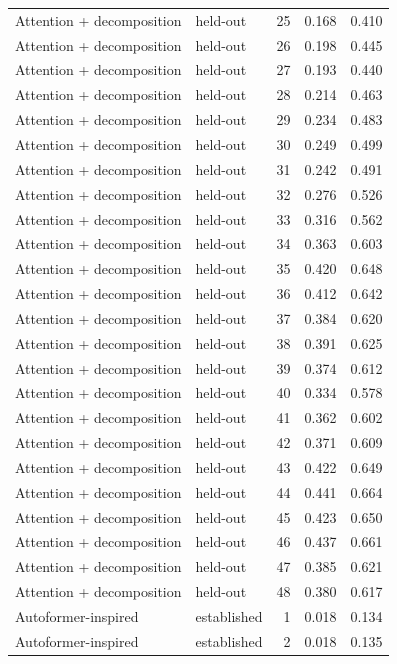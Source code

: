 \begin{tabular}{llrrr}
Attention + decomposition & held-out & 25 & 0.168 & 0.410 \\
Attention + decomposition & held-out & 26 & 0.198 & 0.445 \\
Attention + decomposition & held-out & 27 & 0.193 & 0.440 \\
Attention + decomposition & held-out & 28 & 0.214 & 0.463 \\
Attention + decomposition & held-out & 29 & 0.234 & 0.483 \\
Attention + decomposition & held-out & 30 & 0.249 & 0.499 \\
Attention + decomposition & held-out & 31 & 0.242 & 0.491 \\
Attention + decomposition & held-out & 32 & 0.276 & 0.526 \\
Attention + decomposition & held-out & 33 & 0.316 & 0.562 \\
Attention + decomposition & held-out & 34 & 0.363 & 0.603 \\
Attention + decomposition & held-out & 35 & 0.420 & 0.648 \\
Attention + decomposition & held-out & 36 & 0.412 & 0.642 \\
Attention + decomposition & held-out & 37 & 0.384 & 0.620 \\
Attention + decomposition & held-out & 38 & 0.391 & 0.625 \\
Attention + decomposition & held-out & 39 & 0.374 & 0.612 \\
Attention + decomposition & held-out & 40 & 0.334 & 0.578 \\
Attention + decomposition & held-out & 41 & 0.362 & 0.602 \\
Attention + decomposition & held-out & 42 & 0.371 & 0.609 \\
Attention + decomposition & held-out & 43 & 0.422 & 0.649 \\
Attention + decomposition & held-out & 44 & 0.441 & 0.664 \\
Attention + decomposition & held-out & 45 & 0.423 & 0.650 \\
Attention + decomposition & held-out & 46 & 0.437 & 0.661 \\
Attention + decomposition & held-out & 47 & 0.385 & 0.621 \\
Attention + decomposition & held-out & 48 & 0.380 & 0.617 \\
Autoformer-inspired & established & 1 & 0.018 & 0.134 \\
Autoformer-inspired & established & 2 & 0.018 & 0.135 \\

\end{tabular}
